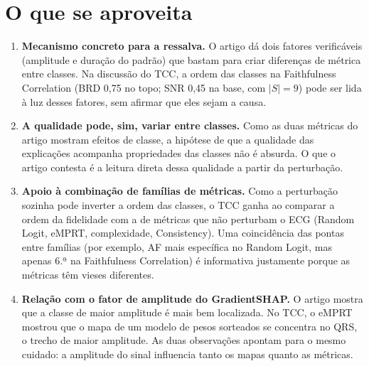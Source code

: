 \documentclass[11pt,a4paper]{article}
\begin{document}
\section{O que se aproveita}
\begin{enumerate}
\item \textbf{Mecanismo concreto para a ressalva.} O artigo dá dois fatores verificáveis (amplitude e duração do padrão) que bastam para criar diferenças de métrica entre classes. Na discussão do TCC, a ordem das classes na Faithfulness Correlation (BRD 0,75 no topo; SNR 0,45 na base, com $|S| = 9$) pode ser lida à luz desses fatores, sem afirmar que eles sejam a causa.
\item \textbf{A qualidade pode, sim, variar entre classes.} Como as duas métricas do artigo mostram efeitos de classe, a hipótese de que a qualidade das explicações acompanha propriedades das classes não é absurda. O que o artigo contesta é a leitura direta dessa qualidade a partir da perturbação.
\item \textbf{Apoio à combinação de famílias de métricas.} Como a perturbação sozinha pode inverter a ordem das classes, o TCC ganha ao comparar a ordem da fidelidade com a de métricas que não perturbam o ECG (Random Logit, eMPRT, complexidade, Consistency). Uma coincidência das pontas entre famílias (por exemplo, AF mais específica no Random Logit, mas apenas 6.ª na Faithfulness Correlation) é informativa justamente porque as métricas têm vieses diferentes.
\item \textbf{Relação com o fator de amplitude do GradientSHAP.} O artigo mostra que a classe de maior amplitude é mais bem localizada. No TCC, o eMPRT mostrou que o mapa de um modelo de pesos sorteados se concentra no QRS, o trecho de maior amplitude. As duas observações apontam para o mesmo cuidado: a amplitude do sinal influencia tanto os mapas quanto as métricas.
\end{enumerate}
\end{document}
